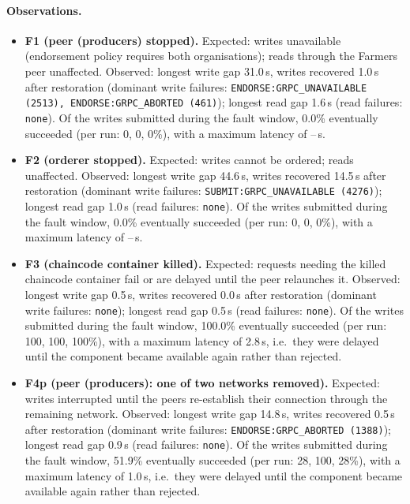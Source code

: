 \paragraph{Observations.}
\begin{itemize}
  \item \textbf{F1 (peer (producers) stopped).} Expected: writes unavailable (endorsement policy requires both organisations); reads through the Farmers peer unaffected. Observed: longest write gap
        31.0\,s, writes recovered 1.0\,s after restoration (dominant write failures: \texttt{ENDORSE:GRPC\_UNAVAILABLE (2513), ENDORSE:GRPC\_ABORTED (461)});
        longest read gap 1.6\,s (read failures: \texttt{none}). Of the writes submitted during the fault
        window, 0.0\% eventually succeeded (per run: 0, 0, 0\%), with a
        maximum latency of --\,s.
  \item \textbf{F2 (orderer stopped).} Expected: writes cannot be ordered; reads unaffected. Observed: longest write gap
        44.6\,s, writes recovered 14.5\,s after restoration (dominant write failures: \texttt{SUBMIT:GRPC\_UNAVAILABLE (4276)});
        longest read gap 1.0\,s (read failures: \texttt{none}). Of the writes submitted during the fault
        window, 0.0\% eventually succeeded (per run: 0, 0, 0\%), with a
        maximum latency of --\,s.
  \item \textbf{F3 (chaincode container killed).} Expected: requests needing the killed chaincode container fail or are delayed until the peer relaunches it. Observed: longest write gap
        0.5\,s, writes recovered 0.0\,s after restoration (dominant write failures: \texttt{none});
        longest read gap 0.5\,s (read failures: \texttt{none}). Of the writes submitted during the fault
        window, 100.0\% eventually succeeded (per run: 100, 100, 100\%), with a
        maximum latency of 2.8\,s, i.e.\ they were delayed until the component became available again rather than rejected.
  \item \textbf{F4p (peer (producers): one of two networks removed).} Expected: writes interrupted until the peers re-establish their connection through the remaining network. Observed: longest write gap
        14.8\,s, writes recovered 0.5\,s after restoration (dominant write failures: \texttt{ENDORSE:GRPC\_ABORTED (1388)});
        longest read gap 0.9\,s (read failures: \texttt{none}). Of the writes submitted during the fault
        window, 51.9\% eventually succeeded (per run: 28, 100, 28\%), with a
        maximum latency of 1.0\,s, i.e.\ they were delayed until the component became available again rather than rejected.

\end{itemize}
